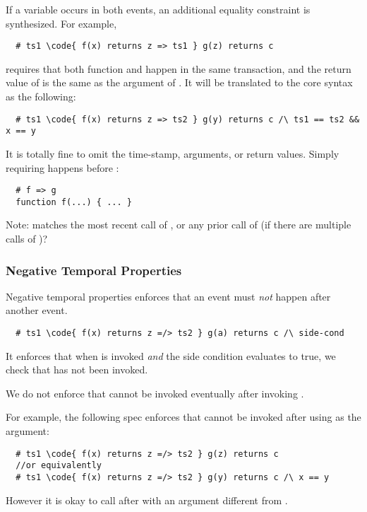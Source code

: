 If a variable occurs in both events, an additional equality constraint
is synthesized.  For example,
\begin{lstlisting}
  # ts1 \code{ f(x) returns z => ts1 } g(z) returns c
\end{lstlisting}
requires that both function  and  happen in the same transaction,
and the return value of  is the same as the argument of .
It will be translated to the core syntax as the following:
\begin{lstlisting}
  # ts1 \code{ f(x) returns z => ts2 } g(y) returns c /\ ts1 == ts2 && x == y
\end{lstlisting}

It is totally fine to omit the time-stamp, arguments, or return values.
Simply requiring  happens before :
\begin{lstlisting}
  # f => g
  function f(...) { ... }
\end{lstlisting}


Note:  matches the most recent call of ,
or any prior call of  (if there are multiple calls of )?



\subsubsection{Negative Temporal Properties}

Negative temporal properties enforces that an event must \emph{not}
happen after another event.

\begin{lstlisting}
  # ts1 \code{ f(x) returns z =/> ts2 } g(a) returns c /\ side-cond
\end{lstlisting}
It enforces that when  is invoked \emph{and} the side condition
evaluates to true, we check that  has not been invoked.

We do not enforce that  cannot be invoked eventually
after invoking .

For example, the following spec enforces that  cannot be
invoked after  using  as the argument:
\begin{lstlisting}
  # ts1 \code{ f(x) returns z =/> ts2 } g(z) returns c
  //or equivalently
  # ts1 \code{ f(x) returns z =/> ts2 } g(y) returns c /\ x == y
\end{lstlisting}
However it is okay to call  after  with an argument different from .

